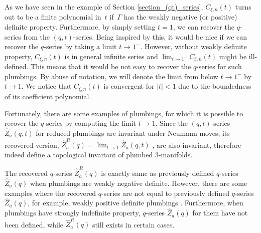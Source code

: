 \documentclass[pdftex]{sigma}
\numberwithin{equation}{section}
\begin{document}
As we have seen in the example of Section \ref{section_(qt)_series}, $ C_{\xi,n}(t) $ turns out to be a finite polynomial in~$ t $ if~$ \Gamma $ has the weakly negative (or positive) definite property. Furthermore, by simply setting $ t=1 $, we can recover the $ q $-series from the $ (q,t) $-series. Being inspired by this, it would be nice if we can recover the $q$-series by taking a limit $ t\rightarrow 1^{-} $. However, without weakly definite property, $ C_{\xi,n}(t) $ is in general infinite series and $ \lim_{t\rightarrow 1^{-}} C_{\xi,n}(t)$ might be ill-defined. This means that it would be not easy to recover the $ q $-series for such plumbings. By abuse of notation, we will denote the limit from below $ t\rightarrow 1^{-} $ by $ t\rightarrow 1 $. We notice that $ C_{\xi,n}(t) $ is convergent for $ |t|<1 $ due to the boundedness of its coefficient polynomial.

Fortunately, there are some examples of plumbings, for which it is possible to recover the $ q $-series by computing the limit $ t\rightarrow 1 $. Since the $ (q,t) $-series $ \hat{Z}_a(q,t) $ for reduced plumbings are invariant under Neumann moves, its recovered version, $\hat{Z}_a^R(q)=\lim_{t\rightarrow1} \hat{Z}_a(q,t)$ , are also invariant, therefore indeed define a topological invariant of plumbed 3-manifolds.

\begin{Remark}
	The recovered $q$-series $\hat{Z}_a^R(q)$ is exactly same as previously defined $q$-series $\hat{Z}_a(q)$ when plumbings are weakly negative definite. However, there are some examples where the recovered $q$-series are not equal to previously defined $q$-series $\hat{Z}_a(q)$, for example, weakly positive definite plumbings \cite{cheng, gukov}. Furthermore, when plumbings have strongly indefinite property, $q$-series $\hat{Z}_a(q)$ for them have not been defined, while $\hat{Z}_a^R(q)$ still exists in certain cases.
\end{Remark}
\end{document}

